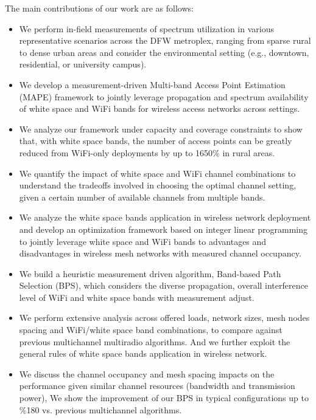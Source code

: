 The main contributions of our work are as follows:
\begin{itemize}
\item We perform in-field measurements of spectrum utilization in various representative
scenarios across the DFW metroplex, ranging from sparse rural to dense urban areas and 
consider the environmental setting (e.g., downtown, residential, or university campus).
\item We develop a measurement-driven Multi-band Access Point Estimation (MAPE) framework 
to jointly leverage propagation and spectrum availability of white space and WiFi bands 
for wireless access networks across settings.
\item We analyze our framework under capacity and coverage constraints 
to show that, with white space bands, the number of access points can be greatly
reduced from WiFi-only deployments by up to 1650\% in rural areas.
\item We quantify the impact of white space and WiFi channel
combinations to understand the tradeoffs involved in choosing the optimal channel setting,
given a certain number of available channels from multiple bands.
\item We analyze the white space bands application in wireless 
network deployment and develop an optimization framework based on integer
linear programming to jointly leverage white space and WiFi bands
to advantages and disadvantages in wireless mesh networks with measured 
channel occupancy.  
\item We build a heuristic measurement driven algorithm, Band-based Path 
Selection (BPS), which considers the diverse propagation, overall interference 
level of WiFi and white space bands with measurement adjust.  
\item We perform extensive analysis across offered loads,
network sizes, mesh nodes spacing and WiFi/white space band combinations, to 
compare against previous multichannel multiradio algorithms. And we
further exploit the general rules of white space bands application in wireless network.  
\item We discuss the channel occupancy and mesh spacing impacts 
on the performance given similar channel resources (bandwidth and
transmission power), We show the improvement of our BPS in typical
configurations up to \%180 vs. previous multichannel algorithms.
\end{itemize}

